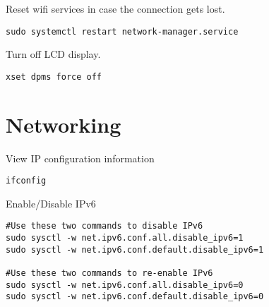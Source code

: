 Reset wifi services in case the connection gets lost.
\begin{lstlisting}
sudo systemctl restart network-manager.service
\end{lstlisting}

Turn off LCD display.
\begin{lstlisting}
xset dpms force off
\end{lstlisting}

\section{Networking}

View IP configuration information
\begin{lstlisting}
ifconfig
\end{lstlisting}

Enable/Disable IPv6
\begin{lstlisting}
#Use these two commands to disable IPv6
sudo sysctl -w net.ipv6.conf.all.disable_ipv6=1
sudo sysctl -w net.ipv6.conf.default.disable_ipv6=1

#Use these two commands to re-enable IPv6
sudo sysctl -w net.ipv6.conf.all.disable_ipv6=0
sudo sysctl -w net.ipv6.conf.default.disable_ipv6=0
\end{lstlisting}